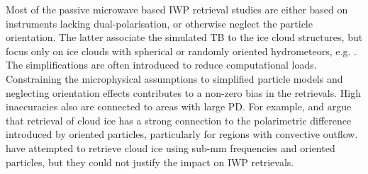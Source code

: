 \documentclass[amt, manuscript]{copernicus}
\begin{document}
Most of the passive microwave based IWP retrieval studies are either based on instruments lacking dual-polarisation, or otherwise  neglect the particle orientation. The latter associate the simulated TB to the ice cloud structures, but focus only on ice clouds with spherical or randomly oriented hydrometeors, e.g. \citet{evans:icecl:05, Zhao:retri:02}. The simplifications are often introduced to reduce computational loads. Constraining the microphysical assumptions to simplified particle models and neglecting orientation effects contributes to a non-zero bias in the retrievals. High inaccuracies also are connected to areas with large PD. For example, \citet{gong:micro:17} and \citet{miao:thepo:03} argue that retrieval of cloud ice has a strong connection to the polarimetric difference introduced by oriented particles, particularly for regions with convective outflow. \citet{jimenez:2007:perfo} have attempted to retrieve cloud ice using sub-mm frequencies and oriented particles, but they could not justify the impact on IWP retrievals. 






\end{document}
